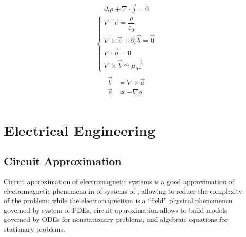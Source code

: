 \documentclass[letterpaper,10pt,english]{jupyterBook}
\begin{document}
\sphinxAtStartPar
{}
\begin{equation*}
\begin{split}\partial_t \rho + \nabla \cdot \vec{j} = 0\end{split}
\end{equation*}
\sphinxAtStartPar
{}
\begin{equation*}
\begin{split}\begin{cases}
    \nabla \cdot \vec{e} = \dfrac{\rho}{\varepsilon_0} \\
    \nabla \times \vec{e} + \partial_t \vec{b} = \vec{0} \\ 
    \nabla \cdot \vec{b} = 0 \\
    \nabla \times \vec{b} \simeq \mu_0 \vec{j} 
  \end{cases}\end{split}
\end{equation*}
\sphinxAtStartPar
{}
\begin{equation*}
\begin{split}\begin{aligned}
      \vec{b} & = \nabla \times \vec{a} \\
      \vec{e} & \simeq - \nabla \phi \\
   \end{aligned}\end{split}
\end{equation*}
\sphinxstepscope


\part{Electrical Engineering}

\sphinxstepscope


\chapter{Circuit Approximation}
\label{\detokenize{ch/circuits:circuit-approximation}}\label{\detokenize{ch/circuits:classical-electromagnetism-electrical-engineering}}\label{\detokenize{ch/circuits::doc}}
\sphinxAtStartPar
Circuit approximation of electromagnetic systems is a good approximation of electromagnetic phenomena in  of systems of , allowing to reduce the complexity of the problem: while the electromagnetism is a “field” physical phenomenon governed by system of PDEs, circuit approximation allows to build models governed by ODEs for non\sphinxhyphen{}stationary problems, and algebraic equations for stationary problems.
\end{document}
